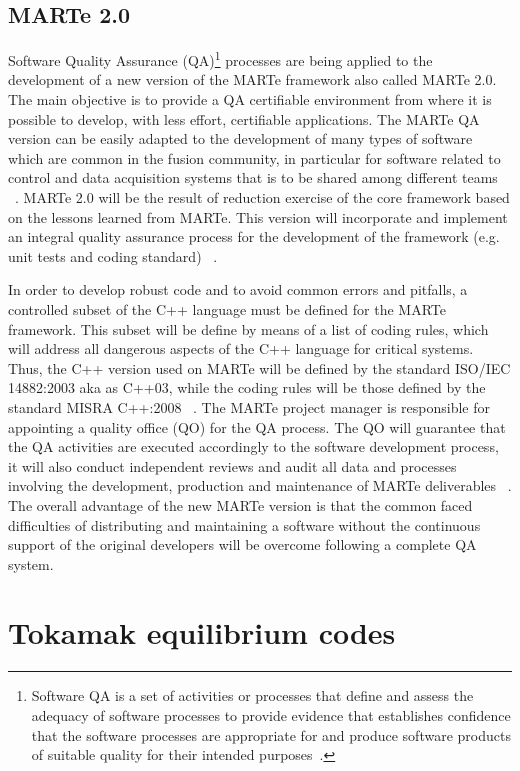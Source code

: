 \subsection{MARTe 2.0}
Software Quality Assurance (QA)\footnote{Software QA is a set of activities or processes that define and assess the adequacy of software processes to provide evidence that establishes confidence that the software processes are appropriate for and produce software products of suitable quality for their intended purposes~\cite[Chapter 5.1]{SQA}.} processes are being applied to the development of a new version of the MARTe framework also  called MARTe 2.0. The  main objective is to provide a QA certifiable environment from where it is possible to develop, with less effort, certifiable applications. The  MARTe QA version can be easily adapted to the development of many types of software which are common in the fusion community, in particular for software related to control and data acquisition systems that is to be shared among different teams  ~\cite{MARTe2}. MARTe 2.0 will be the result of reduction exercise of the core framework based on the lessons learned from MARTe. This version will incorporate and implement an integral quality assurance process for the development of the framework (e.g. unit tests and coding standard) ~\cite{MARTe2PMP}. 
\smallskip

In order to develop robust code and to avoid common errors and pitfalls, a controlled subset of the C++ language must be defined for the MARTe framework. This subset will be define by means of a list of coding rules, which will address all dangerous aspects of the C++ language for critical systems. Thus, the C++ version used on MARTe will be defined by the standard ISO/IEC 14882:2003 aka as C++03, while the coding rules will be those defined by the standard MISRA C++:2008 ~\cite{MARTe2Code}. The MARTe project manager is responsible for appointing a quality office (QO) for the QA process. The QO will guarantee that the QA activities are executed accordingly to the software development process, it will also conduct independent reviews and audit all data and processes involving the development, production and maintenance of MARTe deliverables ~\cite{MARTe2QAP}. The overall advantage of the new MARTe version is that the common faced difficulties of distributing and maintaining a software without  the continuous support of the original developers will be overcome following a complete QA system.



\section{Tokamak equilibrium codes} 

